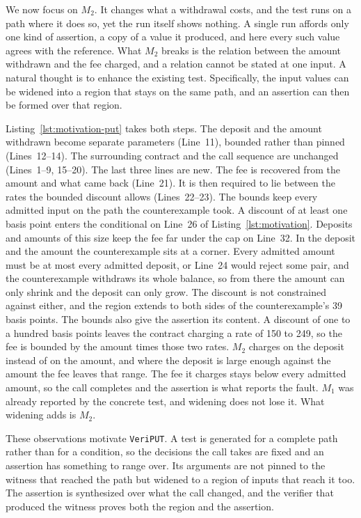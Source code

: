 \documentclass[manuscript,anonymous]{acmart}
\newcommand{\tool}[1]{\texttt{#1}}
\begin{document}
We now focus on $M_2$. It changes what a withdrawal costs, and the test runs on
a path where it does so, yet the run itself shows nothing. A single run affords
only one kind of assertion, a copy of a value it produced, and here every such
value agrees with the reference. What $M_2$ breaks is the relation between the
amount withdrawn and the fee charged, and a relation cannot be stated at one
input. A natural thought is to enhance the existing test. Specifically, the
input values can be widened into a region that stays on the same path, and an
assertion can then be formed over that region.

Listing~\ref{lst:motivation-put} takes both steps. The deposit and the amount
withdrawn become separate parameters (Line~11), bounded rather than pinned
(Lines~12--14). The surrounding contract and the call sequence are unchanged
(Lines~1--9, 15--20). The last three lines are new. The fee is recovered from
the amount and what came back (Line~21). It is then required to lie between the
rates the bounded discount allows (Lines~22--23). The bounds keep every
admitted input on the path the counterexample took. A discount of at least one
basis point enters the conditional on Line~26 of Listing~\ref{lst:motivation}.
Deposits and amounts of this size keep the fee far under the cap on Line~32.
In the deposit and the amount the counterexample sits at a corner. Every
admitted amount must be at most every admitted deposit, or Line~24 would reject
some pair, and the counterexample withdraws its whole balance, so from there the
amount can only shrink and the deposit can only grow. The discount is not
constrained against either, and the region extends to both sides of the
counterexample's 39 basis points. The
bounds also give the assertion its content. A discount of one to a hundred
basis points leaves the contract charging a rate of 150 to 249, so the fee is
bounded by the amount times those two rates. $M_2$ charges on the deposit
instead of on the amount, and where the deposit is large enough against the
amount the fee leaves that range. The fee
it charges stays below every admitted amount, so the call completes and the
assertion is what reports the fault. $M_1$ was already reported by the concrete
test, and widening does not lose it. What widening adds is $M_2$.

These observations motivate \tool{VeriPUT}. A test is generated for a complete
path rather than for a condition, so the decisions the call takes are fixed and
an assertion has something to range over. Its arguments are not pinned to the
witness that reached the path but widened to a region of inputs that reach it
too. The assertion is synthesized over what the call changed, and the verifier
that produced the witness proves both the region and the assertion.
\end{document}
